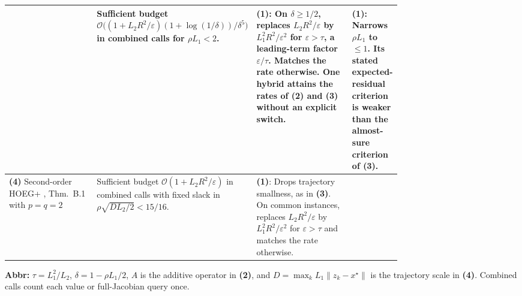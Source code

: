 \begin{table}[tp]
\begin{threeparttable}
\begin{tabularx}{\linewidth}{@{}>{\raggedright\arraybackslash}p{0.23\linewidth}>{\raggedright\arraybackslash}p{0.28\linewidth}>{\raggedright\arraybackslash}p{0.25\linewidth}>{\raggedright\arraybackslash}X@{}}
& Sufficient budget $\mathcal{O}\bigl((1+L_2R^2/\varepsilon)(1+\log(1/\delta))/\delta^5\bigr)$ in combined calls for $\rho L_1<2$.
& \textbf{(1)}: On $\delta\ge1/2$, replaces $L_2R^2/\varepsilon$ by $L_1^2R^2/\varepsilon^2$ for $\varepsilon>\tau$, a leading-term factor $\varepsilon/\tau$. Matches the rate otherwise. One hybrid attains the rates of \textbf{(2)} and \textbf{(3)} without an explicit switch.
& \textbf{(1)}: Narrows $\rho L_1$ to $\le1$. Its stated expected-residual criterion is weaker than the almost-sure criterion of \textbf{(3)}. \\
\midrule
\textbf{(4)} Second-order HOEG+ \citep{wmsoVyas2023v1}, Thm.~B.1 with $p=q=2$
& Sufficient budget $\mathcal{O}(1+L_2R^2/\varepsilon)$ in combined calls with fixed slack in $\rho\sqrt{D L_2/2}<15/16$.
& \textbf{(1)}: Drops trajectory smallness, as in \textbf{(3)}. On common instances, replaces $L_2R^2/\varepsilon$ by $L_1^2R^2/\varepsilon^2$ for $\varepsilon>\tau$ and matches the rate otherwise.
& \\
\bottomrule
\end{tabularx}
\begin{tablenotes}[flushleft]\footnotesize
\item[] \textbf{Abbr:} $\tau=L_1^2/L_2$, $\delta=1-\rho L_1/2$, $A$ is the additive operator in \textbf{(2)}, and $D=\max_k L_1\|z_k-x^\star\|$ is the trajectory scale in \textbf{(4)}. Combined calls count each value or full-Jacobian query once.
\end{tablenotes}
\end{threeparttable}
\end{table}
